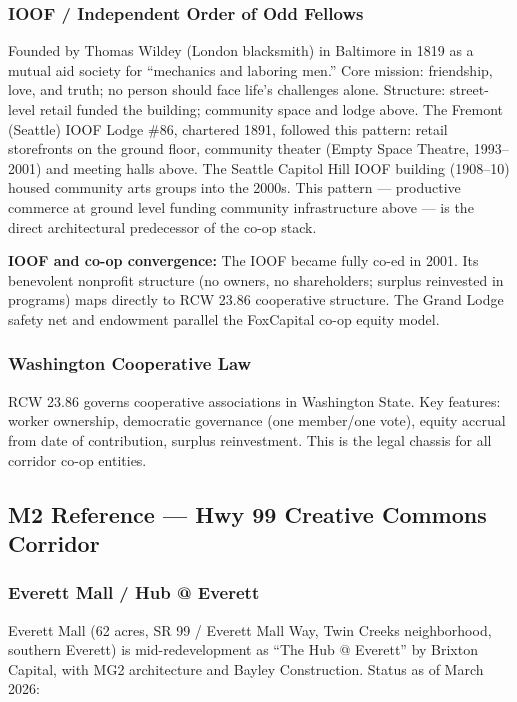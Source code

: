 \documentclass[11pt,letterpaper]{article}
\begin{document}
\subsubsection{IOOF / Independent Order of Odd Fellows}

Founded by Thomas Wildey (London blacksmith) in Baltimore in 1819 as a mutual aid society for ``mechanics and laboring men.'' Core mission: friendship, love, and truth; no person should face life's challenges alone. Structure: street-level retail funded the building; community space and lodge above. The Fremont (Seattle) IOOF Lodge \#86, chartered 1891, followed this pattern: retail storefronts on the ground floor, community theater (Empty Space Theatre, 1993--2001) and meeting halls above. The Seattle Capitol Hill IOOF building (1908--10) housed community arts groups into the 2000s. This pattern --- productive commerce at ground level funding community infrastructure above --- is the direct architectural predecessor of the co-op stack.

\textbf{IOOF and co-op convergence:} The IOOF became fully co-ed in 2001. Its benevolent nonprofit structure (no owners, no shareholders; surplus reinvested in programs) maps directly to RCW 23.86 cooperative structure. The Grand Lodge safety net and endowment parallel the FoxCapital co-op equity model.

\subsubsection{Washington Cooperative Law}

RCW 23.86 governs cooperative associations in Washington State. Key features: worker ownership, democratic governance (one member/one vote), equity accrual from date of contribution, surplus reinvestment. This is the legal chassis for all corridor co-op entities.

\subsection{M2 Reference --- Hwy 99 Creative Commons Corridor}

\subsubsection{Everett Mall / Hub @ Everett}

Everett Mall (62 acres, SR 99 / Everett Mall Way, Twin Creeks neighborhood, southern Everett) is mid-redevelopment as ``The Hub @ Everett'' by Brixton Capital, with MG2 architecture and Bayley Construction. Status as of March 2026:
\end{document}
